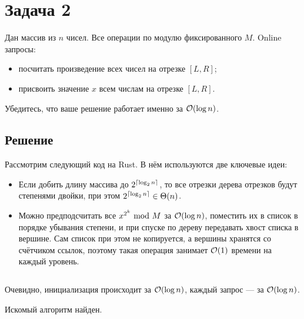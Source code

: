 \section{Задача 2}
Дан массив из $n$ чисел. Все операции по модулю фиксированного $M$.
Online запросы:
\begin{itemize}
    \item посчитать произведение всех чисел на отрезке $[L, R]$;
    \item присвоить значение $x$ всем числам на отрезке $[L, R]$.
\end{itemize}

Убедитесь, что ваше решение работает именно за $\mathcal{O}(\log n)$.

\subsection{Решение}
Рассмотрим следующий код на Rust.
В нём используются две ключевые идеи:
\begin{itemize}
    \item Если добить длину массива до $2^{\left \lceil \log_2 n \right \rceil}$, то все отрезки дерева отрезков будут степенями двойки,
    при этом $2^{\left \lceil \log_2 n \right \rceil} \in \Theta(n)$.
    \item Можно предподсчитать все $x^{2^k} ~\text{mod}~ M$ за $\mathcal{O}(\log n)$,
    поместить их в список в порядке убывания степени,
    и при спуске по дереву передавать хвост списка в вершине.
    Сам список при этом не копируется, а вершины хранятся со счётчиком ссылок,
    поэтому такая операция занимает $\mathcal{O}(1)$ времени на каждый уровень.
\end{itemize}

\inputminted[firstline=5]{rust}{code/src/task02/mod.rs}

Очевидно, инициализация происходит за $\mathcal{O}(\log n)$, каждый запрос --- за $\mathcal{O}(\log n)$.

Искомый алгоритм найден.
